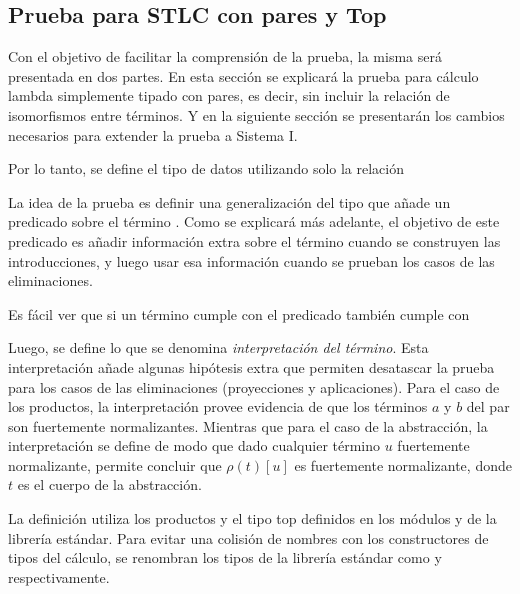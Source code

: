 \subsection{Prueba para STLC con pares y Top}

Con el objetivo de facilitar la comprensión de la prueba, la misma será presentada en dos partes.
En esta sección se explicará la prueba para cálculo lambda simplemente tipado con pares, es decir, sin incluir la relación de isomorfismos entre términos.
Y en la siguiente sección se presentarán los cambios necesarios para extender la prueba a Sistema I.


Por lo tanto, se define el tipo de datos  utilizando solo la relación \type{$\_\hookrightarrow\_$}


La idea de la prueba es definir una generalización del tipo  que añade un predicado sobre el término .
Como se explicará más adelante, el objetivo de este predicado es añadir información extra sobre el término cuando se construyen las introducciones, y luego usar esa información cuando se prueban los casos de las eliminaciones.


Es fácil ver que si un término cumple con el predicado  también cumple con 


Luego, se define lo que se denomina \textit{interpretación del término}.
Esta interpretación añade algunas hipótesis extra que permiten desatascar la prueba para los casos de las eliminaciones (proyecciones y aplicaciones).
Para el caso de los productos, la interpretación provee evidencia de que los términos $a$ y $b$ del par son fuertemente normalizantes.
Mientras que para el caso de la abstracción, la interpretación se define de modo que dado cualquier término $u$ fuertemente normalizante, permite concluir que $\rho (t) [u]$ es fuertemente normalizante, donde $t$ es el cuerpo de la abstracción.


La definición utiliza los productos \func{$\_\times\_$} y el tipo top \type{$\top$} definidos en los módulos  y  de la librería estándar.
Para evitar una colisión de nombres con los constructores de tipos del cálculo, se renombran los tipos de la librería estándar como \func{$\_\otimes\_$} y  respectivamente.

